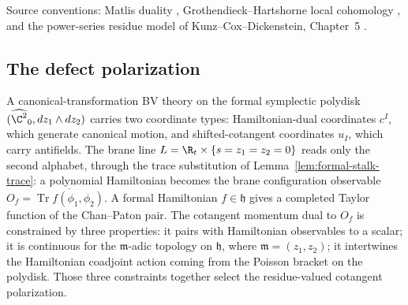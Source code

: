 Source conventions: Matlis duality \cite{matlis-injective},
Grothendieck--Hartshorne local cohomology
\cite{hartshorne-local-cohomology}, and the power-series residue model
of Kunz--Cox--Dickenstein, Chapter~5 \cite{kunz-residues-duality}.

\subsection{The defect polarization}
\label{ssec:app-defect-polarization}

A canonical-transformation BV theory on the formal symplectic polydisk
\((\widehat{\C^2}_0,dz_1\wedge dz_2)\) carries two coordinate types:
Hamiltonian-dual coordinates \(c^I\), which generate canonical motion,
and shifted-cotangent coordinates \(u_I\), which carry antifields.  The
brane line \(L=\R_t\times\{s=z_1=z_2=0\}\) reads only the second
alphabet, through the trace substitution of
Lemma~\ref{lem:formal-stalk-trace}: a polynomial Hamiltonian becomes
the brane configuration observable
\(O_f=\overline{\operatorname{Tr}f(\phi_1,\phi_2)}\).  A formal
Hamiltonian \(f\in\mathfrak h\) gives a completed Taylor function of
the Chan--Paton pair.  The cotangent
momentum dual to \(O_f\) is constrained by three properties: it pairs
with Hamiltonian observables to a scalar; it is continuous for the
\(\mathfrak m\)-adic topology on \(\mathfrak h\), where
\(\mathfrak m=(z_1,z_2)\); it intertwines the Hamiltonian coadjoint
action coming from the Poisson bracket on the polydisk.  Those three
constraints together select the residue-valued cotangent polarization.

